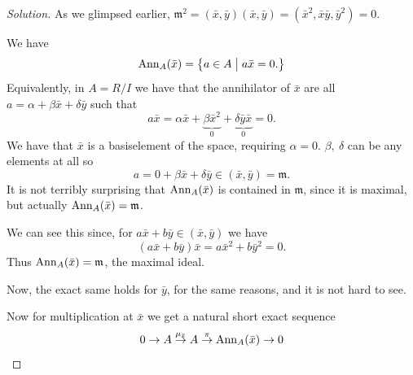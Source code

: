 \documentclass[11pt]{article}
\begin{document}
\begin{proof}[Solution]
    As we glimpsed earlier, 
    $\mathfrak m^2 = (\bar x, \bar y)(\bar x,\bar y) 
    = (\bar x^2, \bar x \bar y, \bar y^2) = 0$. 

    We have 
    \[
        \operatorname{Ann}_A(\bar x) = \left\{
            a \in A \bigm| a\bar x = 0. 
        \right\}
    \]
    Equivalently, in $A = R/I$ we have that 
    the annihilator of $\bar x$ are 
    all $a = \alpha + \beta \bar x + \delta \bar y$ such that 
    \[
        a \bar x 
        = \alpha \bar x + \underbrace{\beta \bar x^2}_{0} 
        + \underbrace{\delta \bar y \bar x}_0 = 0. 
    \]
    We have that $\bar x$ is a basiselement of 
    the space, requiring $\alpha = 0$. 
    $\beta, \ \delta$ can be any elements at 
    all so 
    \[
        a = 0 + \beta \bar x + \delta \bar y 
        \in (\bar x, \bar y) = \mathfrak m. 
    \]
    It is not terribly surprising that $\operatorname{Ann}_A(\bar x)$ 
    is contained in $\mathfrak m$, since 
    it is maximal, but actually $\operatorname{Ann}_A(\bar x) = \mathfrak m$. 

    We can see this since, for 
    $a\bar x + b \bar y \in (\bar x, \bar y)$ we have 
    \[
        (a \bar x + b \bar y) \bar x 
        = a \bar x^2 + b \bar y^2 = 0. 
    \]
    Thus $\operatorname{Ann}_A(\bar x) = \mathfrak m$, the maximal ideal. 

    Now, the exact same holds for $\bar y$, for 
    the same reasons, and it is not hard to see. 

    Now for multiplication at $\bar x$ we 
    get a natural short exact sequence 
    \[
        0 \to A
        \overset{\mu_{\bar x}}\to A \overset\pi\to 
        \operatorname{Ann}_A(\bar x) \to 0 
    \]
    
\end{proof}
\end{document}
